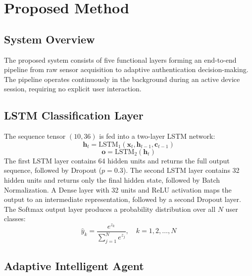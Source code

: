 \documentclass[3p,times,procedia]{elsarticle}
\begin{document}

\section{Proposed Method}
\label{sec:method}

\subsection{System Overview}

The proposed system consists of five functional layers forming
an end-to-end pipeline from raw sensor acquisition to adaptive
authentication decision-making. The pipeline operates
continuously in the background during an active device session,
requiring no explicit user interaction.

\subsection{LSTM Classification Layer}

The sequence tensor $(10, 36)$ is fed into a two-layer LSTM
network:
\begin{equation}
    \mathbf{h}_t = \text{LSTM}_1(\mathbf{x}_t,
    \mathbf{h}_{t-1}, \mathbf{c}_{t-1})
    \label{eq:lstm1}
\end{equation}
\begin{equation}
    \mathbf{o} = \text{LSTM}_2(\mathbf{h}_t)
    \label{eq:lstm2}
\end{equation}
The first LSTM layer contains 64 hidden units and returns the
full output sequence, followed by Dropout ($p = 0.3$). The
second LSTM layer contains 32 hidden units and returns only
the final hidden state, followed by Batch Normalization. A
Dense layer with 32 units and ReLU activation maps the output
to an intermediate representation, followed by a second Dropout
layer. The Softmax output layer produces a probability
distribution over all $N$ user classes:
\begin{equation}
    \hat{y}_k = \frac{e^{z_k}}{\sum_{j=1}^{N} e^{z_j}},
    \quad k = 1, 2, \ldots, N
    \label{eq:softmax}
\end{equation}

\subsection{Adaptive Intelligent Agent}
\end{document}
